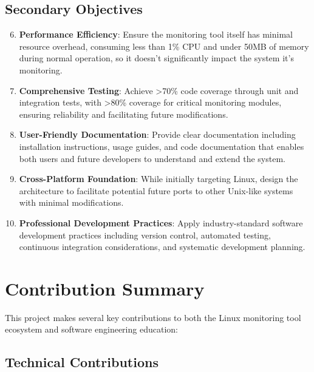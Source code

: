 \documentclass[12pt,a4paper,oneside]{report}
\begin{document}
\subsection{Secondary Objectives}

\begin{enumerate}
    \setcounter{enumi}{5}
    \item \textbf{Performance Efficiency}: Ensure the monitoring tool itself has minimal resource overhead, consuming less than 1\% CPU and under 50MB of memory during normal operation, so it doesn't significantly impact the system it's monitoring.
    
    \item \textbf{Comprehensive Testing}: Achieve >70\% code coverage through unit and integration tests, with >80\% coverage for critical monitoring modules, ensuring reliability and facilitating future modifications.
    
    \item \textbf{User-Friendly Documentation}: Provide clear documentation including installation instructions, usage guides, and code documentation that enables both users and future developers to understand and extend the system.
    
    \item \textbf{Cross-Platform Foundation}: While initially targeting Linux, design the architecture to facilitate potential future ports to other Unix-like systems with minimal modifications.
    
    \item \textbf{Professional Development Practices}: Apply industry-standard software development practices including version control, automated testing, continuous integration considerations, and systematic development planning.
\end{enumerate}

\section{Contribution Summary}
\label{sec:contributions}

This project makes several key contributions to both the Linux monitoring tool ecosystem and software engineering education:

\subsection{Technical Contributions}
\end{document}
